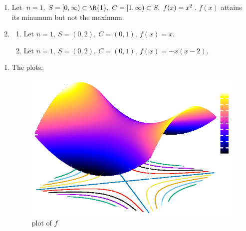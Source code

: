 \documentclass{article}
\begin{document}

    \begin{tasks}
        \item \begin{enumerate}
            \item Let \(n=1,\ S=[0, \infty)\subset\R{1},\ C=[1, \infty)\subset S,\ f(x)=x^2\). \(f(x)\) attains its minumum but not the maximum.
            \item \begin{enumerate}
                \item Let \(n=1,\ S=(0, 2),\ C=(0, 1),\ f(x)=x\).
                \item Let \(n=1,\ S=(0, 2),\ C=(0, 1),\ f(x)=-x(x-2)\).
            \end{enumerate}
        \end{enumerate}
        \item \begin{enumerate}
            \item The plots: \\
                \begin{minipage}{0.9\linewidth}
                    \centering
                    \begin{minipage}[t]{0.49\linewidth}
                        \begin{figure}[H]
                            \centering
                            \includegraphics[width=1\linewidth]{1-2-a-1.eps} 
                            \caption[\(f\)]{plot of \(f\)}
                        \end{figure}
                    \end{minipage}      

\end{minipage}
\end{enumerate}
\end{tasks}
\end{document}
